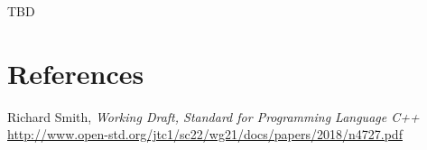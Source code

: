 \documentclass{wg21}
\begin{document}
TBD




\section{References}
\renewcommand{\section}[2]{}%
\begin{thebibliography}{9}
    Richard Smith,
    \emph{Working Draft, Standard for Programming Language C++}\newline
    \url{http://www.open-std.org/jtc1/sc22/wg21/docs/papers/2018/n4727.pdf}

\end{thebibliography}
\end{document}
